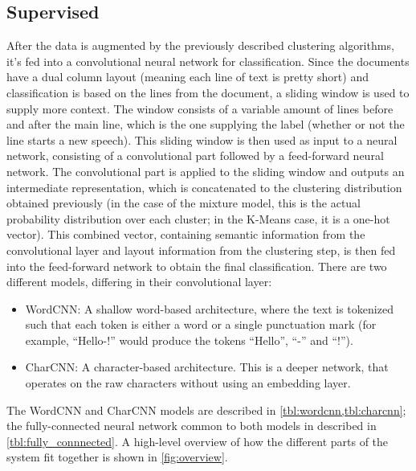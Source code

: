 \subsection{Supervised}%
\label{sec:sup}
After the data is augmented by the previously described clustering algorithms,
it's fed into a convolutional neural network for classification. Since the
documents have a dual column layout (meaning each line of text is pretty short)
and classification is based on the lines from the document, a sliding window is
used to supply more context. The window consists of a variable amount of lines
before and after the main line, which is the one supplying the label (whether
or not the line starts a new speech). This sliding window is then used as input
to a neural network, consisting of a convolutional part followed by a
feed-forward neural network. The convolutional part is applied to the sliding
window and outputs an intermediate
representation, which is concatenated to the clustering distribution
obtained previously (in the case of the mixture model, this is the actual
probability distribution over each cluster; in the K-Means case, it is a
one-hot vector). This combined vector, containing semantic information from the
convolutional layer and layout information from the clustering step, is then fed
into the feed-forward network to obtain the final classification.
There are two different models, differing in their convolutional layer:
\begin{itemize}
  \item WordCNN: A shallow word-based architecture\citep{kim2014conv}, where the
  text is tokenized such that each token is either a word or a single punctuation
  mark (for example, ``Hello-!'' would produce the tokens ``Hello'', ``-'' and
  ``!'').
  \item CharCNN: A character-based architecture\citep{zhang2015character}. This
  is a deeper network, that operates on the raw characters without using an
  embedding layer.
\end{itemize}
The WordCNN and CharCNN models are described in \cref{tbl:wordcnn,tbl:charcnn};
the fully-connected neural network common to both models in described in
\cref{tbl:fully_connnected}. A high-level overview of how the different parts
of the system fit together is shown in \cref{fig:overview}.

